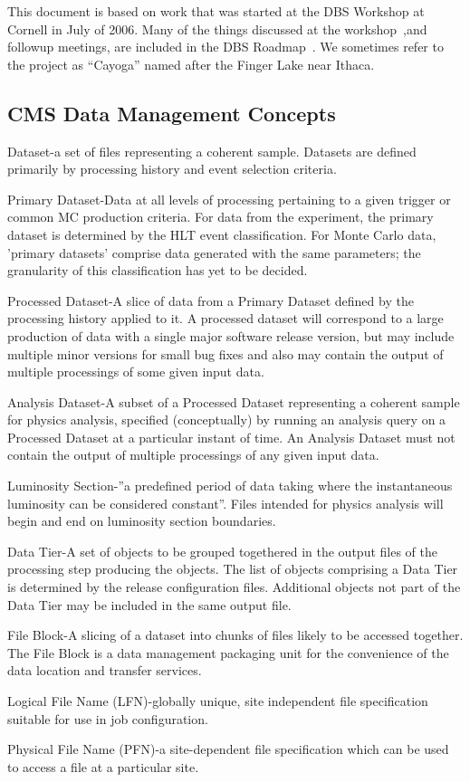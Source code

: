 \documentclass{cmspaper}
\begin{document}
This document is based on work that was started at the DBS Workshop at Cornell in July of 2006. Many of the things discussed at the workshop~\cite{dbs-workshop},and followup meetings, are included in the DBS Roadmap~\cite{dbs-roadmap}. We sometimes refer to the project as ``Cayoga'' named after the Finger Lake near Ithaca. 

\subsection{CMS Data Management Concepts}

\begin{description}
\item{Dataset}-a set of files representing a coherent sample.  Datasets are
defined primarily by processing history and event selection criteria.
\item{Primary Dataset}-Data at all levels of processing pertaining to a given
trigger or common MC production criteria.  For data from the experiment, the
primary dataset is determined by the HLT event classification.
For Monte Carlo data, 'primary datasets' comprise
data generated with the same parameters; the granularity of this
classification has yet to be decided.
\item{Processed Dataset}-A slice of data from a Primary Dataset defined by the
processing history applied to it.  A processed dataset
will correspond to a large production of data with a
single major software release version, but may include
multiple minor versions for small bug fixes and also
may contain the output of multiple processings of
some given input data.
\item{Analysis Dataset}-A subset of a Processed Dataset representing a
coherent sample for physics analysis, 
specified (conceptually) by running an analysis query on a Processed Dataset at
a particular instant of time.  An Analysis Dataset must not contain
the output of multiple processings of any given input data.
\item{Luminosity Section}-''a predefined period of data taking where the
instantaneous luminosity can be considered constant''.  Files intended
for physics analysis will begin and end on luminosity section boundaries.
\item{Data Tier}-A set of objects to be grouped togethered in the output
files of the processing step producing the objects.  The list of objects
comprising a Data Tier is determined by the release configuration files.
Additional objects not part of the Data Tier may be included in the same
output file.
\item{File Block}-A slicing of a dataset into chunks of files 
likely to be accessed together.  The File Block is a
data management packaging unit for the convenience of the data
location and transfer services.
\item{Logical File Name (LFN)}-globally unique, site independent
file specification suitable for use in job configuration.
\item{Physical File Name (PFN)}-a site-dependent file specification
which can be used to access a file at a particular site.
\end{description}
\end{document}
